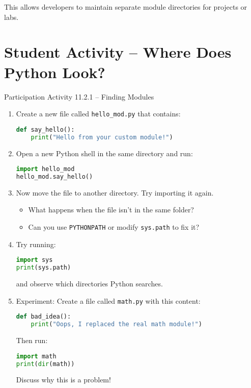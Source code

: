 \documentclass[12pt]{article}
\begin{document}
This allows developers to maintain separate module directories for projects or labs.

\section{Student Activity – Where Does Python Look?}

\begin{activitybox}{Participation Activity 11.2.1 – Finding Modules}
\begin{enumerate}
  \item Create a new file called \texttt{hello\_mod.py} that contains:
  \begin{lstlisting}[language=Python]
def say_hello():
    print("Hello from your custom module!")
  \end{lstlisting}

  \item Open a new Python shell in the same directory and run:
  \begin{lstlisting}[language=Python]
import hello_mod
hello_mod.say_hello()
  \end{lstlisting}

  \item Now move the file to another directory. Try importing it again.
  \begin{itemize}
    \item What happens when the file isn’t in the same folder?
    \item Can you use \texttt{PYTHONPATH} or modify \texttt{sys.path} to fix it?
  \end{itemize}

  \item Try running:
  \begin{lstlisting}[language=Python]
import sys
print(sys.path)
  \end{lstlisting}
  and observe which directories Python searches.

  \item Experiment:  
  Create a file called \texttt{math.py} with this content:
  \begin{lstlisting}[language=Python]
def bad_idea():
    print("Oops, I replaced the real math module!")
  \end{lstlisting}

  Then run:
  \begin{lstlisting}[language=Python]
import math
print(dir(math))
  \end{lstlisting}

  Discuss why this is a problem!
\end{enumerate}
\end{activitybox}
\end{document}

